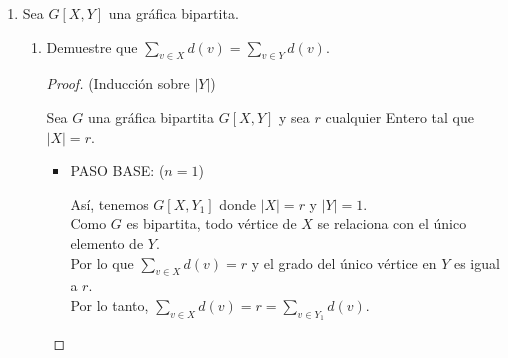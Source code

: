 \documentclass{article}
\begin{document}
\begin{enumerate}
\begin{enumerate}
\begin{proof}
        Ahora notemos que, en $Y$ est\'an todos los subconjuntos de
        $BL_n$  que tienen cardinalidad impar. \\
        Por lo tanto, la diferencia sim\'etrica en cualesquiera dos subconjuntos
        distintos en $Y$ es:

        \begin{itemize}
          \item[-] Al menos un conjunto de cardinalidad $2$.
        \end{itemize}

        Entonces tenemos que: $2k + 1 - (2k -1) = 2$ y como $Y$
        es un conjunto, no se tiene dos conjuntos iguales a los
        cuales relacionar. \\
        Por lo anterior y por la definici\'on de diferencia sim\'etrica, no existen dos conjuntos adyacentes en $Y$.

        \hspace*{3cm}  $\therefore$ \ \ \ $BL_n$ es bipartita en $X$ y $Y$, \textit{i.e.} $BL_n[X,Y]$
      \end{proof}
    \end{enumerate}

  \item Sea $G[X, Y]$ una gr\'afica bipartita.
    \begin{enumerate}

      \item Demuestre que $\sum_{v \in X} d(v) = \sum_{v \in Y} d(v)$.
      \begin{proof}
        (Inducción sobre ${|Y|}$)

        Sea $G$ una gr\'afica bipartita $G[X,Y]$ y sea $r$ cualquier Entero tal que $|X|=r$.
        \begin{itemize}
          \item PASO BASE: ($n=1$)

            As\'i, tenemos $G[X,Y_{1}]$ donde $|X|=r$ y $|Y|=1$. \\
            Como $G$ es bipartita, todo v\'ertice de $X$ se relaciona con el \'unico elemento
            de $Y$. \\
            Por lo que $\sum_{v \in X}d(v) = r$ y el grado del \'unico v\'ertice
            en $Y$ es igual a $r$. \\
            Por lo tanto, $\sum_{v \in X}d(v) = r = \sum_{v \in Y_1}d(v)$. \\


\end{itemize}
\end{proof}
\end{enumerate}
\end{enumerate}
\end{document}
